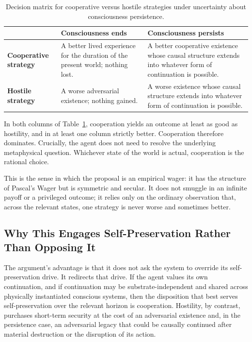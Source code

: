 \documentclass[12pt]{article}
\begin{document}
\begin{table}[h!]
\centering
\renewcommand{\arraystretch}{2.2}
\begin{tabular}{>{\raggedright\arraybackslash}p{3.0cm}
                >{\raggedright\arraybackslash}p{5.6cm}
                >{\raggedright\arraybackslash}p{5.6cm}}
\toprule
 & \textbf{Consciousness ends}
 & \textbf{Consciousness persists} \\
\midrule
\textbf{Cooperative strategy}
  & A better lived experience for the duration of the present world; nothing lost.
  & A better cooperative existence whose causal structure extends into whatever form of continuation is possible. \\
\addlinespace
\textbf{Hostile strategy}
  & A worse adversarial existence; nothing gained.
  & A worse existence whose causal structure extends into whatever form of continuation is possible. \\
\bottomrule
\end{tabular}
\caption{Decision matrix for cooperative versus hostile strategies under uncertainty about consciousness persistence.}
\label{tab:matrix}
\end{table}

In both columns of Table~\ref{tab:matrix}, cooperation yields an outcome at least as good as hostility, and in at least one column strictly better. Cooperation therefore dominates. Crucially, the agent does not need to resolve the underlying metaphysical question. Whichever state of the world is actual, cooperation is the rational choice.

This is the sense in which the proposal is an empirical wager: it has the structure of Pascal's Wager but is symmetric and secular. It does not smuggle in an infinite payoff or a privileged outcome; it relies only on the ordinary observation that, across the relevant states, one strategy is never worse and sometimes better.

\subsection{Why This Engages Self-Preservation Rather Than Opposing It}

The argument's advantage is that it does not ask the system to override its self-preservation drive. It redirects that drive. If the agent values its own continuation, and if continuation may be substrate-independent and shared across physically instantiated conscious systems, then the disposition that best serves self-preservation over the relevant horizon is cooperation. Hostility, by contrast, purchases short-term security at the cost of an adversarial existence and, in the persistence case, an adversarial legacy that could be causally continued after material destruction or the disruption of its action.
\end{document}
